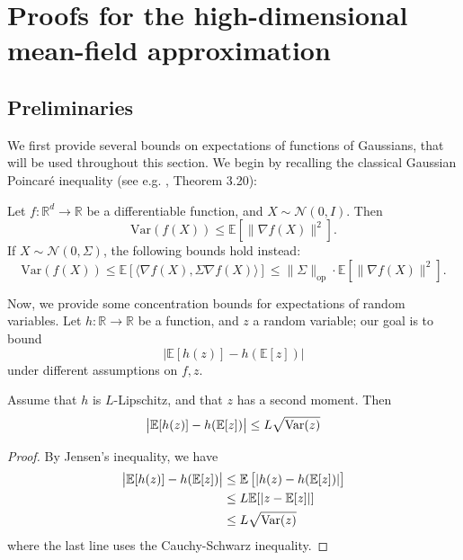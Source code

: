 \section{Proofs for the high-dimensional mean-field approximation}

\label{2302:sec:app:hd_mean_field}
\subsection{Preliminaries}
We first provide several bounds on expectations of functions of Gaussians, that will be used throughout this section. We begin by recalling the classical Gaussian Poincaré inequality (see e.g. \cite{boucheron2013concentration}, Theorem 3.20):
\begin{lemma}\label{2302:lem:gauss_poincare}
    Let $f: \mathbb{R}^d \to \mathbb{R}$ be a differentiable function, and $X \sim \mathcal N(0, I)$. Then
    \[ \mathrm{Var}(f(X)) \leq \mathbb E\left[\lVert\nabla f(X) \rVert^2 \right]. \]
    If $X \sim \mathcal{N}(0, \Sigma)$, the following bounds hold instead:
    \[ \mathrm{Var}(f(X)) \leq \mathbb E\left[\langle\nabla f(X), \Sigma \nabla f(X) \rangle \right] \leq \lVert \Sigma \rVert_{\mathrm{op}} \cdot \mathbb E\left[\lVert\nabla f(X) \rVert^2 \right] . \]
\end{lemma}

Now, we provide some concentration bounds for expectations of random variables. Let $h:\mathbb{R}\to\mathbb{R}$ be a function, and $z$ a random variable; our goal is to bound
\[ \left|\mathbb{E}[h(z)] - h(\mathbb{E}[z])\right| \]
under different assumptions on $f, z$.
\begin{lemma}\label{2302:lem:average_lipschitz_function}
    Assume that $h$ is $L$-Lipschitz, and that $z$ has a second moment. Then
\begin{equation}
        \left|\mathbb{E}[h(z)] - h(\mathbb{E}[z])\right| \leq L\sqrt{\operatorname{Var}(z)}
    \end{equation}
\end{lemma}
\begin{proof}
    By Jensen's inequality, we have
    \begin{align*}
        \left|\mathbb{E}[h(z)] - h(\mathbb{E}[z])\right| &\leq \mathbb{E}\left[|h(z) - h(\mathbb{E}[z])| \right] \\
        &\leq L \mathbb{E}[|z - \mathbb{E}[z]|] \\
        &\leq L\sqrt{\operatorname{Var}(z)}
    \end{align*}
    where the last line uses the Cauchy-Schwarz inequality.
\end{proof}

